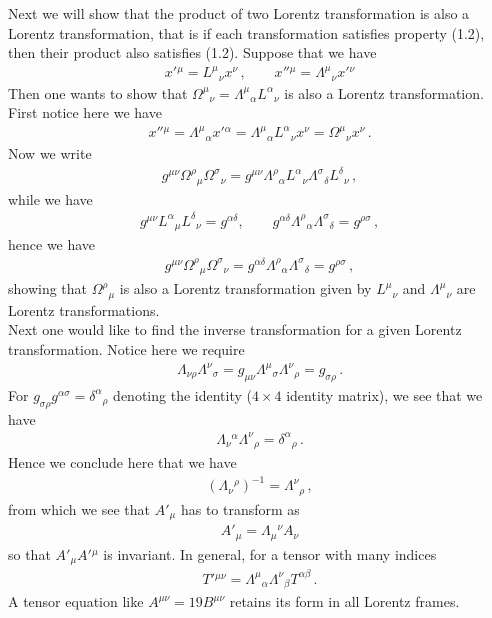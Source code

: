 \documentclass[11pt, onesided]{book}
\theoremstyle{break}
\theoremstyle{break}
\begin{document}
Next we will show that the product of two Lorentz transformation is also a Lorentz transformation, that is if each transformation satisfies property (1.2), then their product also satisfies (1.2). Suppose that we have
\begin{align*}
x'{}^\mu = L^\mu{}_\nu x^\nu\,, \qquad x''{}^\mu = \Lambda^\mu{}_\nu x'{}^\nu 
\end{align*}
Then one wants to show that $\Omega^\mu{}_\nu = \Lambda^\mu{}_\alpha L^\alpha{}_\nu$ is also a Lorentz transformation. First notice here we have
\begin{align*}
x''{}^\mu = \Lambda^\mu{}_\alpha x'{}^\alpha = \Lambda^\mu{}_\alpha L^\alpha{}_\nu  x^\nu = \Omega^\mu{}_\nu x^\nu\,.
\end{align*}
Now we write
\begin{align*}
g^{\mu\nu}\Omega^\rho{}_\mu \Omega^\sigma{}_\nu = g^{\mu\nu} \Lambda^\rho{}_\alpha L^\alpha{}_\nu \Lambda^\sigma{}_\delta L^\delta{}_\nu\,,
\end{align*}
while we have
\begin{align*}
g^{\mu \nu} L^\alpha{}_\mu L^\delta{}_\nu = g^{\alpha\delta}, \qquad g^{\alpha \delta} \Lambda^\rho{}_\alpha \Lambda^\sigma{}_\delta = g^{\rho \sigma}\,,
\end{align*}
hence we have
\begin{align*}
 g^{\mu\nu}\Omega^\rho{}_\mu \Omega^\sigma{}_\nu = g^{\alpha \delta} \Lambda^\rho{}_\alpha \Lambda^\sigma{}_\delta = g^{\rho \sigma}\,,
\end{align*}
showing that $\Omega^\rho{}_\mu$ is also a Lorentz transformation given by $L^\mu{}_\nu$ and $\Lambda^\mu{}_\nu$ are Lorentz transformations.\\


Next one would like to find the inverse transformation for a given Lorentz transformation. Notice here we require
\begin{align*}
\Lambda_{\nu\rho} \Lambda^{\nu}{}_\sigma=g_{\mu\nu} \Lambda^\mu{}_\sigma \Lambda^\nu{}_\rho = g_{\sigma\rho}\,.
\end{align*}
For $g_{\sigma\rho}g^{\alpha\sigma} =  \delta^\alpha{}_\rho$ denoting the identity ($4\times 4$ identity matrix), we see that we have
\begin{align*}
\Lambda_\nu{}^\alpha \Lambda^\nu{}_\rho = \delta^\alpha{}_\rho\,.
\end{align*}
Hence we conclude here that we have
\begin{align*}
(\Lambda_\nu{}^\rho)^{-1} = \Lambda^\nu{}_\rho \,,
\end{align*}
from which we see that $A'_\mu$ has to transform as 
\begin{align*}
A'{}_\mu = \Lambda_\mu{}^\nu A_\nu
\end{align*}
so that $A'{}_{\mu}A'{}^\mu$ is invariant. In general, for a tensor with many indices
\begin{align*}
T'{}^{\mu \nu}  = \Lambda^\mu{}_\alpha \Lambda^\nu{}_\beta T^{\alpha\beta}\,.
\end{align*}
A tensor equation like $A^{\mu\nu} = 19B^{\mu\nu}$ retains its form in all Lorentz frames. \\
\end{document}
